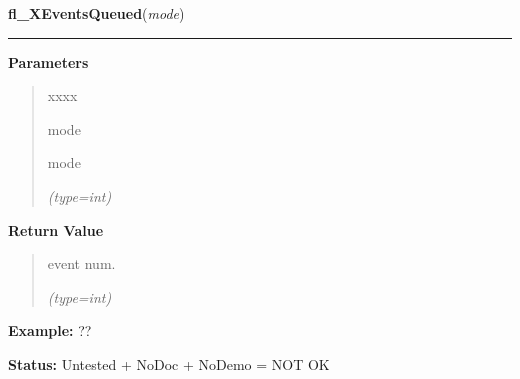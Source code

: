 \hspace{.8\funcindent}\begin{boxedminipage}{\funcwidth}

    \raggedright \textbf{fl\_XEventsQueued}(\textit{mode})

    \vspace{-1.5ex}

    \rule{\textwidth}{0.5\fboxrule}
\setlength{\parskip}{2ex}
\setlength{\parskip}{1ex}
      \textbf{Parameters}
      \vspace{-1ex}

      \begin{quote}
        \begin{Ventry}{xxxx}

          \item[mode]

          mode

            {\it (type=int)}

        \end{Ventry}

      \end{quote}

      \textbf{Return Value}
    \vspace{-1ex}

      \begin{quote}
      event num.

      {\it (type=int)}

      \end{quote}

\textbf{Example:} ??



\textbf{Status:} Untested + NoDoc + NoDemo = NOT OK



    \end{boxedminipage}

    \label{xformslib:flxbasic:fl_XPutBackEvent}

    \vspace{0.5ex}

